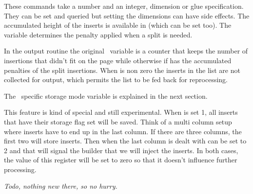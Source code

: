 These commands take a number and an integer, dimension or glue specification.
They can be set and queried but setting the dimensions can have side effects. The
accumulated height of the inserts is available in \type {\insertheights} (which
can be set too). The \type {\floatingpenalty} variable determines the penalty
applied when a split is needed.

In the output routine the original \TEX\ variable \type {\insertpenalties} is a
counter that keeps the number of insertions that didn't fit on the page while
otherwise if has the accumulated penalties of the split insertions. When \type
{\holdinginserts} is non zero the inserts in the list are not collected for
output, which permits the list to be fed back for reprocessing.

The \LUAMETATEX\ specific storage mode \type {\insertstoring} variable is
explained in the next section.

\stopsectionlevel

\startsectionlevel[title=Storing]

This feature is kind of special and still experimental. When \type
{\insertstoring} is set 1, all inserts that have their storage flag set will be
saved. Think of a multi column setup where inserts have to end up in the last
column. If there are three columns, the first two will store inserts. Then when
the last column is dealt with \type {\insertstoring} can be set to 2 and that
will signal the builder that we will inject the inserts. In both cases, the value
of this register will be set to zero so that it doesn't influence further
processing.

\stopsectionlevel

\startsectionlevel[title=Callbacks]

{\em Todo, nothing new there, so no hurry.}

\stopsectionlevel

\stopdocument
